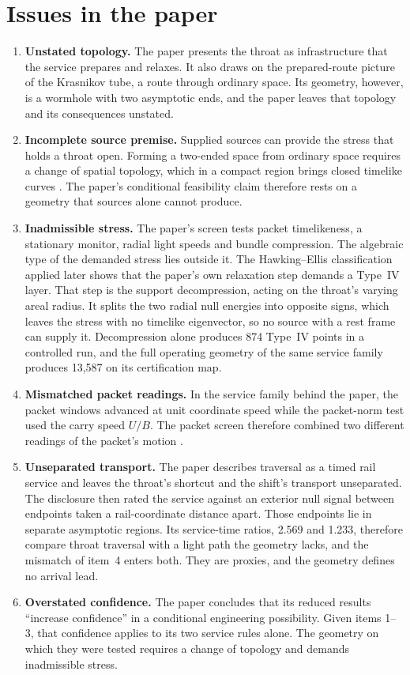\documentclass[10pt]{article}
\begin{document}
\section{Issues in the paper}

\begin{enumerate}
\item \textbf{Unstated topology.} The paper presents the throat as infrastructure that the service prepares and relaxes.
It also draws on the prepared-route picture of the Krasnikov tube, a route through ordinary space. Its geometry, however,
is a wormhole with two asymptotic ends, and the paper leaves that topology and its consequences unstated.
\item \textbf{Incomplete source premise.} Supplied sources can provide the stress that holds a throat open. Forming a
two-ended space from ordinary space requires a change of spatial topology, which in a compact region brings closed
timelike curves \cite{geroch}. The paper's conditional feasibility claim therefore rests on a geometry that sources
alone cannot produce.
\item \textbf{Inadmissible stress.} The paper's screen tests packet timelikeness, a stationary monitor, radial light
speeds and bundle compression. The algebraic type of the demanded stress lies outside it. The Hawking--Ellis
classification applied later \cite{le,repo} shows that the paper's own relaxation step demands a Type~IV layer. That step
is the support decompression, acting on the throat's varying areal radius. It splits the two radial null energies into
opposite signs, which leaves the stress with no timelike eigenvector, so no source with a rest frame can supply it.
Decompression alone produces 874 Type~IV points in a controlled run, and the full operating geometry of the same service
family produces 13,587 on its certification map.
\item \textbf{Mismatched packet readings.} In the service family behind the paper, the packet windows advanced at unit
coordinate speed while the packet-norm test used the carry speed $U/B$. The packet screen therefore combined two different
readings of the packet's motion \cite{repo}.
\item \textbf{Unseparated transport.} The paper describes traversal as a timed rail service and leaves the throat's
shortcut and the shift's transport unseparated. The disclosure \cite{disclosure} then rated the service against an
exterior null signal between endpoints taken a rail-coordinate distance apart. Those endpoints lie in separate asymptotic
regions. Its service-time ratios, 2.569 and 1.233, therefore compare throat traversal with a light path the geometry
lacks, and the mismatch of item~4 enters both. They are proxies, and the geometry defines no arrival lead.
\item \textbf{Overstated confidence.} The paper concludes that its reduced results ``increase confidence'' in a
conditional engineering possibility. Given items 1--3, that confidence applies to its two service rules alone. The
geometry on which they were tested requires a change of topology and demands inadmissible stress.
\end{enumerate}
\end{document}
